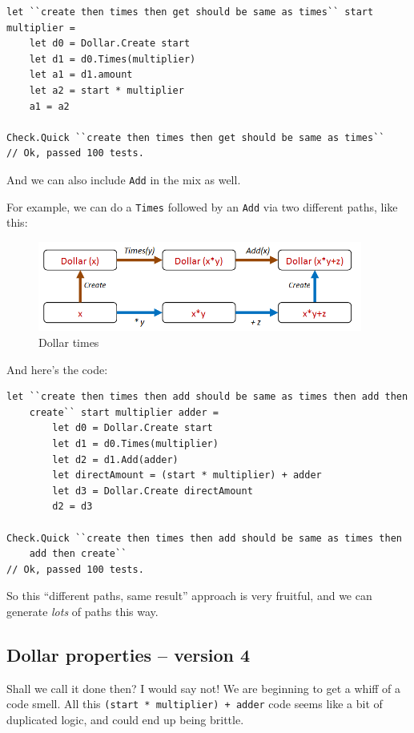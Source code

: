 \begin{verbatim}
let ``create then times then get should be same as times`` start multiplier = 
	let d0 = Dollar.Create start
	let d1 = d0.Times(multiplier)
	let a1 = d1.amount
	let a2 = start * multiplier     
	a1 = a2

Check.Quick ``create then times then get should be same as times``
// Ok, passed 100 tests.
\end{verbatim}
And we can also include \texttt{Add} in the mix as well.

For example, we can do a \texttt{Times} followed by an \texttt{Add} via
two different paths, like this:

\begin{figure}[htbp]
\centering
\includegraphics[width=0.95\textwidth]{pics/property_dollar_times3.png}
\caption{Dollar times}
\end{figure}

And here's the code:

\begin{verbatim}
let ``create then times then add should be same as times then add then 
    create`` start multiplier adder = 
        let d0 = Dollar.Create start
        let d1 = d0.Times(multiplier)
        let d2 = d1.Add(adder)
        let directAmount = (start * multiplier) + adder
        let d3 = Dollar.Create directAmount 
        d2 = d3

Check.Quick ``create then times then add should be same as times then 
    add then create`` 
// Ok, passed 100 tests.
\end{verbatim}
So this ``different paths, same result'' approach is very fruitful, and
we can generate \emph{lots} of paths this way.

\subsection{Dollar properties -- version
4}\label{dollar-properties-version-4}

Shall we call it done then? I would say not! 
We are beginning to get a whiff of a code smell. All this
\texttt{(start\ *\ multiplier)\ +\ adder} code seems like a bit of
duplicated logic, and could end up being brittle.

